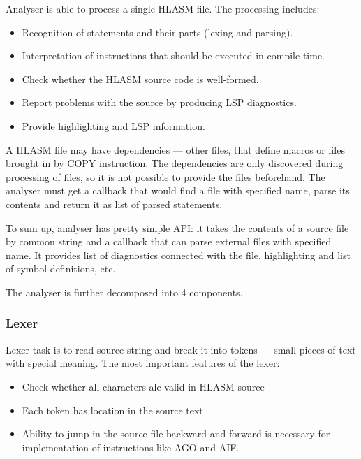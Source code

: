 Analyser is able to process a single HLASM file. The processing includes:
\begin{itemize}
 \item Recognition of statements and their parts (lexing and parsing).
 \item Interpretation of instructions that should be executed in compile time.
 \item Check whether the HLASM source code is well-formed.
 \item Report problems with the source by producing LSP diagnostics.
 \item Provide highlighting and LSP information.
\end{itemize}

A HLASM file may have dependencies --- other files, that define macros or files brought in by COPY instruction. The dependencies are only discovered during processing of files, so it is not possible to provide the files beforehand. The analyser must get a callback that would find a file with specified name, parse its contents and return it as list of parsed statements. 

To sum up, analyser has pretty simple API: it takes the contents of a source file by common string and a callback that can parse external files with specified name. It provides list of diagnostics connected with the file, highlighting and list of symbol definitions, etc.

The analyser is further decomposed into 4 components.

\subsubsection{Lexer}

Lexer task is to read source string and break it into tokens --- small pieces of text with special meaning. The most important features of the lexer:
\begin{itemize}
	\item Check whether all characters ale valid in HLASM source
	\item Each token has location in the source text
	\item Ability to jump in the source file backward and forward is necessary for implementation of instructions like AGO and AIF.
\end{itemize}


